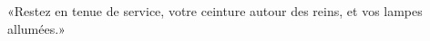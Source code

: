 \encetemps \jesusdisciples
	«Restez en tenue de service,
	votre ceinture autour des reins, et vos lampes allumées.»
